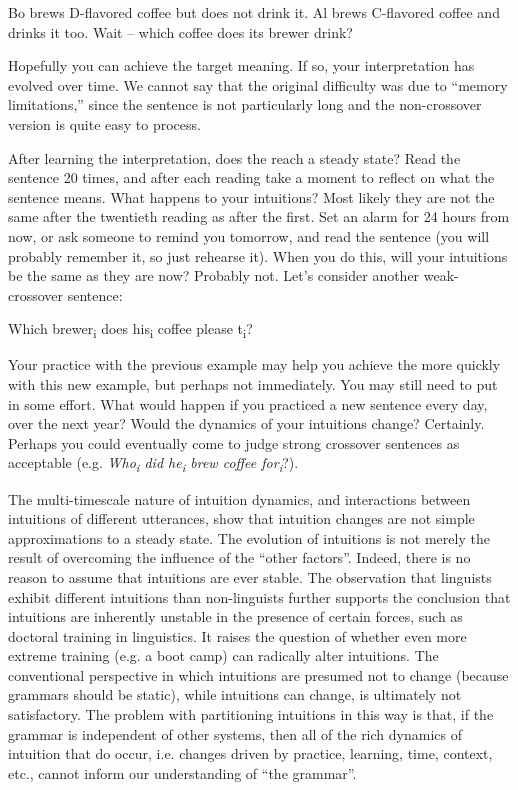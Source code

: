 \ea
\begin{exe}
  {Bo brews D-flavored coffee but does not drink it. Al brews C-flavored coffee and drinks it too.} 
  {Wait -- which coffee does its brewer drink?}
\end{exe}
\z

  Hopefully you can achieve the target  meaning. If so, your interpretation has evolved over time. We cannot say that the original difficulty was due to “memory limitations,” since the sentence is not particularly long and the non-crossover version is quite easy to process. 

  After learning the  interpretation, does the  reach a steady state? Read the sentence 20 times, and after each reading take a moment to reflect on what the sentence means. What happens to your intuitions? Most likely they are not the same after the twentieth reading as after the first. Set an alarm for 24 hours from now, or ask someone to remind you tomorrow, and read the sentence (you will probably remember it, so just rehearse it). When you do this, will your intuitions be the same as they are now? Probably not. Let's consider another weak-crossover sentence: 

\ea
Which brewer\textsubscript{i} does his\textsubscript{i} coffee please t\textsubscript{i}?
\z

  Your practice with the previous example may help you achieve the  more quickly with this new example, but perhaps not immediately. You may still need to put in some effort. What would happen if you practiced a new  sentence every day, over the next year? Would the dynamics of your intuitions change? Certainly. Perhaps you could eventually come to judge strong crossover sentences as acceptable (e.g. \textit{Who\textsubscript{i} did he\textsubscript{i} brew coffee for\textsubscript{i}}?). 

  The multi-timescale nature of intuition dynamics, and interactions between intuitions of different utterances, show that intuition changes are not simple approximations to a steady state. The evolution of intuitions is not merely the result of overcoming the influence of the “other factors”. Indeed, there is no reason to assume that intuitions are ever stable. The observation that linguists exhibit different intuitions than non-linguists \citep{Spencer1973} further supports the conclusion that intuitions are inherently unstable in the presence of certain  forces, such as doctoral training in linguistics. It raises the question of whether even more extreme training (e.g. a  boot camp) can radically alter intuitions. The conventional perspective in which  intuitions are presumed not to change (because grammars should be static), while  intuitions can change, is ultimately not satisfactory. The problem with partitioning intuitions in this way is that, if the grammar is independent of other systems, then all of the rich dynamics of intuition that do occur, i.e. changes driven by practice, learning, time, context, etc., cannot inform our understanding of “the grammar”.

